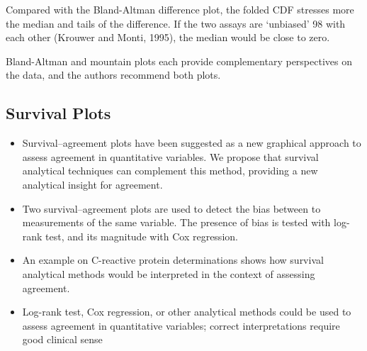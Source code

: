 \documentclass[Chap2main.tex]{subfiles}
\begin{document}
Compared with the Bland-Altman difference plot, the folded CDF stresses more the median and tails of the difference. 
If the two assays are ‘unbiased’ 98 with each other (Krouwer and Monti, 1995), the median would be close to zero. 



Bland-Altman and mountain plots each provide complementary perspectives on the data, and the authors recommend both plots.

\subsection{Survival Plots}

\begin{itemize}
	
	\item Survival–agreement plots have been suggested as a new graphical approach to assess agreement in
	quantitative variables. We propose that survival analytical techniques can complement this method, providing a new analytical insight
	for agreement.
	
	
	\item Two survival–agreement plots are used to detect the bias between to measurements of the same variable. The presence of
	bias is tested with log-rank test, and its magnitude with Cox regression.
	
	\item An example on C-reactive protein determinations shows how survival analytical methods would be interpreted in the context
	of assessing agreement.
	
	\item Log-rank test, Cox regression, or other analytical methods could be used to assess agreement in quantitative variables;
	correct interpretations require good clinical sense
	
\end{itemize}



\end{document}

